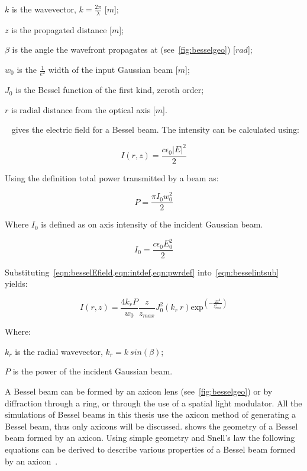    \indent $k$ is the wavevector, $k=\tfrac{2\pi}{\lambda}$ [$m$];

    \indent $z$ is the propagated distance [$m$]; 

    \indent $\beta$ is the angle the wavefront propagates at (see~\cref{fig:besselgeo}) [$rad$]; 

    \indent $w_0$ is the $\tfrac{1}{e^2}$ width of the input Gaussian beam [$m$]; 

    \indent $J_0$ is the Bessel function of the first kind, zeroth order; 

    \indent $r$ is radial distance from the optical axis [$m$]. 

\medskip


~ gives the electric field for a Bessel beam. The intensity can be calculated using:

\begin{equation}
    I(r,z)=\frac{c\epsilon_0\left|E\right|^2}{2}
    \label{eqn:besselintsub}
\end{equation}

Using the definition total power transmitted by a beam as:

\begin{equation}
    P=\frac{\pi I_0w_0^2}{2}
    \label{eqn:pwrdef}
\end{equation}

Where $I_0$ is defined as on axis intensity of the incident Gaussian beam.

\begin{equation}
    I_0=\frac{c\epsilon_0E_0^2}{2}
    \label{eqn:intdef}
\end{equation}

Substituting~\cref{eqn:besselEfield,eqn:intdef,eqn:pwrdef} into~\cref{eqn:besselintsub} yields:

\begin{equation}
    I(r,z)=\frac{4k_rP}{w_0}\frac{z}{z_{max}}J_0^2\left(k_r\ r\right)\text{exp}^{\left(-\frac{2z^2}{z^2_{max}}\right)}
    \label{eqn:besselInt}
\end{equation}


\noindent Where:

    \indent $k_r$ is the radial wavevector, $k_r=k\ sin(\beta)$;

    \indent $P$ is the power of the incident Gaussian beam.

    \medskip

A Bessel beam can be formed by an axicon lens (see~\cref{fig:besselgeo}) or by diffraction through a ring, or through the use of a spatial light modulator.
All the simulations of Bessel beams in this thesis use the axicon method of generating a Bessel beam, thus only axicons will be discussed.
 shows the geometry of a Bessel beam formed by an axicon.
Using simple geometry and Snell's law the following equations can be derived to describe various properties of a Bessel beam formed by an axicon~\cite{merola2012characterization}.

